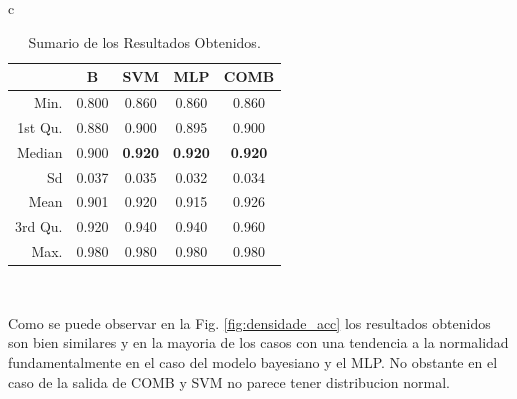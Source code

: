 \documentclass[12pt]{article}
\begin{document}
 
 
\begin{table}[!h]
\renewcommand{\arraystretch}{1.3}
\caption{Sumario de los Resultados Obtenidos. }
\label{tab:analisis_data}
\centering
\begin{tabular}{c}
\begin{tabular}{rcccc}
\hline
         &B   &     SVM  &  MLP   &  COMB     \\
\hline     
 Min.    &0.800   &0.860   &0.860   &0.860\\  
 1st Qu. &0.880   &0.900   &0.895   &0.900\\  
 Median  &0.900   &\textbf{0.920}   &\textbf{0.920}   &\textbf{0.920}\\  
 Sd      &0.037   &0.035   &0.032   &0.034\\
 Mean    &0.901   &0.920   &0.915   &0.926\\  
 3rd Qu. &0.920   &0.940   &0.940   &0.960\\  
 Max.    &0.980   &0.980   &0.980   &0.980\\  
\hline 
\end{tabular}\\
\end{tabular}
\end{table} 
 
Como se puede observar en la Fig. \ref{fig:densidade_acc} los resultados obtenidos son bien similares y en la mayoria de los casos con una tendencia a la normalidad fundamentalmente en el caso del modelo bayesiano y el MLP. No obstante en el caso de la salida de COMB y SVM no parece tener distribucion normal. 
\end{document}

